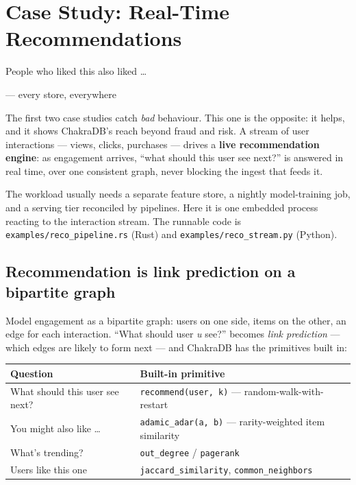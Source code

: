 \documentclass[
  11pt,
  openany]{book}
\begin{document}
\chapter{Case Study: Real-Time
Recommendations}\label{case-study-real-time-recommendations}

\epigraph{People who liked this also liked \ldots}{--- every store, everywhere}

The first two case studies catch \emph{bad} behaviour. This one is the
opposite: it helps, and it shows ChakraDB's reach beyond fraud and risk.
A stream of user interactions --- views, clicks, purchases --- drives a
\textbf{live recommendation engine}: as engagement arrives, ``what
should this user see next?'' is answered in real time, over one
consistent graph, never blocking the ingest that feeds it.

The workload usually needs a separate feature store, a nightly
model-training job, and a serving tier reconciled by pipelines. Here it
is one embedded process reacting to the interaction stream. The runnable
code is \texttt{examples/reco\_pipeline.rs} (Rust) and
\texttt{examples/reco\_stream.py} (Python).

\section{Recommendation is link prediction on a bipartite
graph}\label{recommendation-is-link-prediction-on-a-bipartite-graph}

Model engagement as a bipartite graph: users on one side, items on the
other, an edge for each interaction. ``What should user \emph{u} see?''
becomes \emph{link prediction} --- which edges are likely to form next
--- and ChakraDB has the primitives built in:

\begin{longtable}[]{@{}
  >{\raggedright\arraybackslash}p{}
  >{\raggedright\arraybackslash}p{}@{}}
\toprule\noalign{}
\begin{minipage}[b]{\linewidth}\raggedright
Question
\end{minipage} & \begin{minipage}[b]{\linewidth}\raggedright
Built-in primitive
\end{minipage} \\
\midrule\noalign{}
\endhead
\bottomrule\noalign{}
\endlastfoot
What should this user see next? & \texttt{recommend(user,\ k)} ---
random-walk-with-restart \\
You might also like \ldots{} & \texttt{adamic\_adar(a,\ b)} ---
rarity-weighted item similarity \\
What's trending? & \texttt{out\_degree} / \texttt{pagerank} \\
Users like this one & \texttt{jaccard\_similarity},
\texttt{common\_neighbors} \\
\end{longtable}
\end{document}
